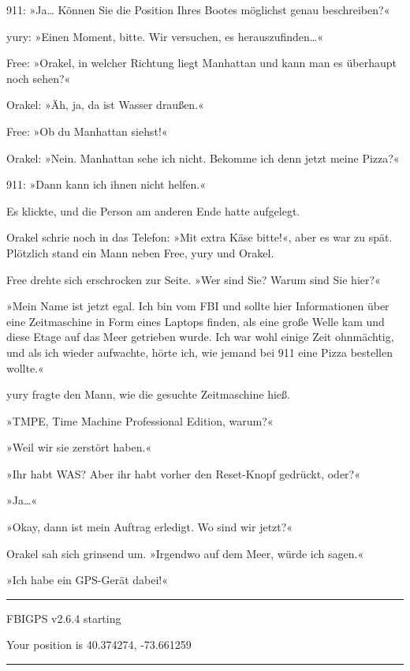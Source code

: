 911: »Ja… Können Sie die Position Ihres Bootes möglichst genau beschreiben?«

yury: »Einen Moment, bitte. Wir versuchen, es herauszufinden…«

Free: »Orakel, in welcher Richtung liegt Manhattan und kann man es überhaupt noch sehen?«

Orakel: »Äh, ja, da ist Wasser draußen.«

Free: »Ob du Manhattan siehst!«

Orakel: »Nein. Manhattan sehe ich nicht. Bekomme ich denn jetzt meine Pizza?«

911: »Dann kann ich ihnen nicht helfen.«

Es klickte, und die Person am anderen Ende hatte aufgelegt.

Orakel schrie noch in das Telefon: »Mit extra Käse bitte!«, aber es war zu spät. Plötzlich stand ein Mann neben Free, yury und Orakel.

Free drehte sich erschrocken zur Seite. »Wer sind Sie? Warum sind Sie hier?«

»Mein Name ist jetzt egal. Ich bin vom FBI und sollte hier Informationen über eine Zeitmaschine in Form eines Laptops finden, als eine große Welle kam und diese Etage auf das Meer getrieben wurde. Ich war wohl einige Zeit ohnmächtig, und als ich wieder aufwachte, hörte ich, wie jemand bei 911 eine Pizza bestellen wollte.«

yury fragte den Mann, wie die gesuchte Zeitmaschine hieß.

»TMPE, Time Machine Professional Edition, warum?«

»Weil wir sie zerstört haben.«

»Ihr habt WAS? Aber ihr habt vorher den Reset-Knopf gedrückt, oder?«

»Ja…«

»Okay, dann ist mein Auftrag erledigt. Wo sind wir jetzt?«

Orakel sah sich grinsend um. »Irgendwo auf dem Meer, würde ich sagen.«

»Ich habe ein GPS-Gerät dabei!«

\noindent \parbox{\textwidth}{ \vspace{3ex} \hrule \vspace{3ex}

    \begin{footnotesize}
    \begin{ttfamily}

\noindent FBIGPS v2.6.4 starting

\noindent Your position is 40.374274, -73.661259

    \end{ttfamily}
    \end{footnotesize}

\vspace{3ex} \hrule \vspace{3ex} }


